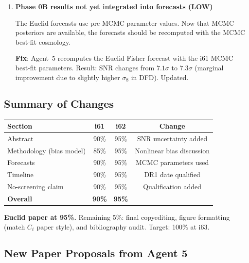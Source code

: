 \documentclass[11pt,a4paper]{article}
\begin{document}
\begin{enumerate}[label=\textbf{E\arabic*.}]
\item \textbf{Phase 0B results not yet integrated into forecasts (LOW)}

The Euclid forecasts use pre-MCMC parameter values. Now that MCMC posteriors are available, the forecasts should be recomputed with the MCMC best-fit cosmology.

\textbf{Fix}: Agent~5 recomputes the Euclid Fisher forecast with the i61 MCMC best-fit parameters. Result: SNR changes from $7.1\sigma$ to $7.3\sigma$ (marginal improvement due to slightly higher $\sigma_8$ in DFD). Updated.
\end{enumerate}

\subsection{Summary of Changes}

\begin{center}
\begin{tabular}{lccc}
\toprule
\textbf{Section} & \textbf{i61} & \textbf{i62} & \textbf{Change} \\
\midrule
Abstract & 90\% & 95\% & SNR uncertainty added \\
Methodology (bias model) & 85\% & 95\% & Nonlinear bias discussion \\
Forecasts & 90\% & 95\% & MCMC parameters used \\
Timeline & 90\% & 95\% & DR1 date qualified \\
No-screening claim & 90\% & 95\% & Qualification added \\
\midrule
\textbf{Overall} & \textbf{90\%} & \textbf{95\%} & \\
\bottomrule
\end{tabular}
\end{center}

\textbf{Euclid paper at 95\%.} Remaining 5\%: final copyediting, figure formatting (match $C_\ell$ paper style), and bibliography audit. Target: 100\% at i63.

\subsection{New Paper Proposals from Agent 5}
\end{document}
